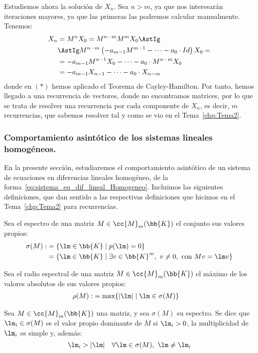 Estudiemos ahora la solución de $X_n$. Sea $n>m$, ya que nos interesarán iteraciones mayores, ya que las primeras las podremos calcular manualmente. Tenemos:
\begin{align*}
    X_n &= M^nX_0 = M^{n-m}M^mX_0 \AstIg\\
    &\AstIg M^{n-m}\left(-a_{m-1}M^{m-1} - \dots - a_0\cdot Id\right)X_0 =\\
    &= -a_{m-1}M^{n-1}X_0 - \dots - a_0\cdot M^{n-m}X_0 \\
    &= -a_{m-1}X_{n-1} - \dots - a_0\cdot X_{n-m}
\end{align*}
donde en $(\ast)$ hemos aplicado el Teorema de Cayley-Hamilton.
Por tanto, hemos llegado a una recurrencia de vectores, donde no encontramos matrices, por lo que se trata de resolver una recurrencia por cada componente de $X_n$, es decir, $m$ recurrencias, que sabemos resolver tal y como se vio en el Tema~\ref{chp:Tema2}.


\subsubsection{Comportamiento asintótico de los sistemas lineales homogéneos.}
En la presente sección, estudiaremos el comportamiento asintótico de un sistema de ecuaciones en diferencias lineales homogéneo, de la forma~\ref{eq:sistema_eq_dif_lineal_Homogeneo}. Incluimos las siguientes definiciones, que dan sentido a las respectivas definiciones que hicimos en el Tema~\ref{chp:Tema2} para recurrencias.
\begin{definicion}[Espectro]
    Sea el espectro de una matriz $M\in \cc{M}_m(\bb{K})$
    el conjunto sus valores propios:
    \begin{align*}
        \sigma(M) :&= \{\lm \in \bb{K} \mid p(\lm) = 0\}\\
        &= \{\lm \in \bb{K} \mid \exists v\in \bb{K}^m,~v\neq 0, \text{ con } Mv=\lm v\}
    \end{align*}
\end{definicion}

\begin{definicion}
    Sea el radio espectral de una matriz $M\in \cc{M}_m(\bb{K})$
    el máximo de los valores absolutos de sus valores propios:
    \begin{align*}
        \rho(M) :&= \max\{|\lm|\mid \lm\in \sigma(M)\}
    \end{align*}
\end{definicion}

\begin{definicion}
    Sea $M\in \cc{M}_m(\bb{K})$ una matriz, y sea $\sigma(M)$ su espectro. Se dice que $\lm_i\in \sigma(M)$ es el valor propio dominante de $M$ si $\lm_i>0$, la multiplicidad de $\lm_i$ es simple y, además:
    \begin{equation*}
        \lm_i>|\lm|\quad \forall \lm\in \sigma(M),~\lm\neq \lm_i
    \end{equation*}
\end{definicion}

